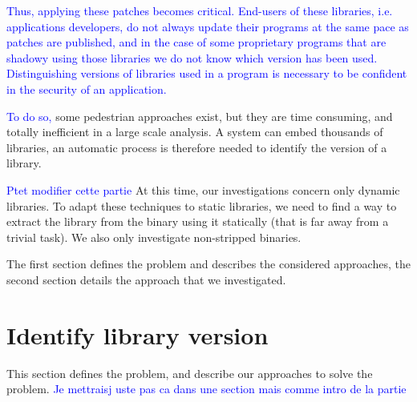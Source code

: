 \documentclass{article}
\newcommand{\ludo}[1]{\textcolor{blue}{#1}}
\newcommand{\thom}[1]{\textcolor{red}{#1}}
\begin{document}
    \ludo{Thus, applying these patches becomes critical.}
    \ludo{End-users of these libraries, i.e. applications developers, do not
    always update their programs at the same pace as patches are published,
    and in the case of some proprietary programs that are shadowy using those
    libraries we do not know which version has been used.}
    \ludo{Distinguishing versions of libraries used in a program is necessary
    to be confident in the security of an application.} 
    
    
    
    \ludo{To do so, }some pedestrian approaches exist,
    but they are time consuming, and totally inefficient in a large scale
    analysis. A system can embed thousands of libraries, an automatic process
    is therefore needed to identify the version of a library.
    
    \ludo{Ptet modifier cette partie}
    At this time, our investigations concern only dynamic libraries. To adapt
    these techniques to static libraries, we need to find a way to extract the
    library from the binary using it statically (that is far away from a
    trivial task). We also only investigate non-stripped binaries.
    
    The first section defines the problem and describes the considered
    approaches, the second section details the approach that we investigated.
    

   \section{Identify library version}
	This section defines the problem, and describe our approaches to solve the problem.
   \ludo{Je mettraisj uste pas ca dans une section mais comme intro de la
   partie}
\end{document}
